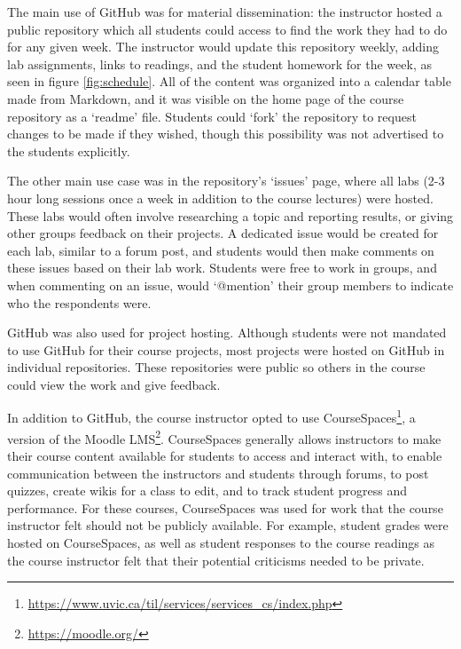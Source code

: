 
The main use of GitHub was for material dissemination: the instructor hosted a public repository which all students could access to find the work they had to do for any given week. The instructor would update this repository weekly, adding lab assignments, links to readings, and the student homework for the week, as seen in figure \ref{fig:schedule}. All of the content was organized into a calendar table made from Markdown, and it was visible on the home page of the course repository as a `readme' file. Students could `fork' the repository to request changes to be made if they wished, though this possibility was not advertised to the students explicitly.

The other main use case was in the repository's `issues' page, where all labs (2-3 hour long sessions once a week in addition to the course lectures) were hosted. These labs would often involve researching a topic and reporting results, or giving other groups feedback on their projects. A dedicated issue would be created for each lab, similar to a forum post, and students would then make comments on these issues based on their lab work. Students were free to work in groups, and when commenting on an issue, would `@mention' their group members to indicate who the respondents were.

GitHub was also used for project hosting. Although students were not mandated to use GitHub for their course projects, most projects were hosted on GitHub in individual repositories. These repositories were public so others in the course could view the work and give feedback.

In addition to GitHub, the course instructor opted to use CourseSpaces\footnote{\url{https://www.uvic.ca/til/services/services_cs/index.php}}, a version of the Moodle LMS\footnote{\url{https://moodle.org/}}. CourseSpaces generally allows instructors to make their course content available for students to access and interact with, to enable communication between the instructors and students through forums, to post quizzes, create wikis for a class to edit, and to track student progress and performance. For these courses, CourseSpaces was used for work that the course instructor felt should not be publicly available. For example, student grades were hosted on CourseSpaces, as well as student responses to the course readings as the course instructor felt that their potential criticisms needed to be private.
